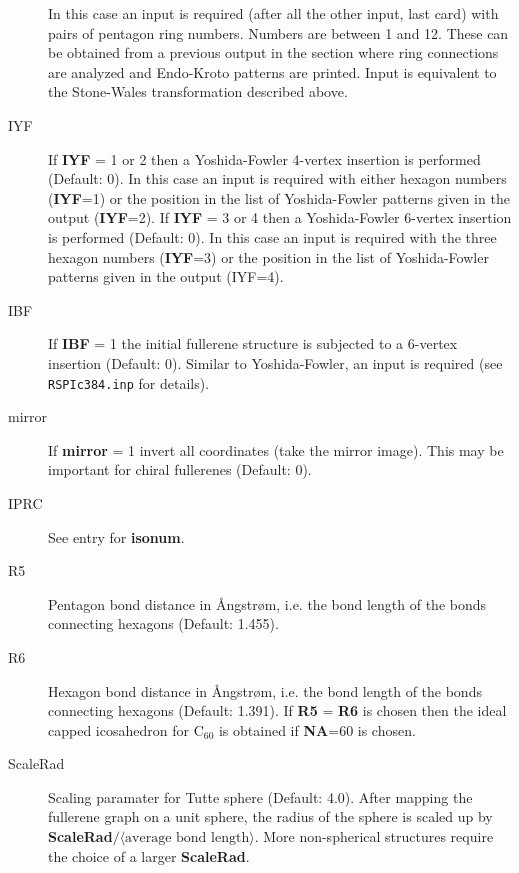 \documentclass[article,a4paper,twoside]{memoir}
\newcommand{\C}[1]{\ensuremath{\mathrm{C}_{#1}}}
\newcommand{\filename}[1]{\texttt{#1}}
\newcommand{\paramname}[1]{{\color{green}\textbf{#1}}}
\begin{document}
\begin{description}
In this case an input is required (after all the other input, last card) with pairs of
pentagon ring numbers. Numbers are between 1 and 12. These can be obtained
from a previous output in the section where ring connections are analyzed
and Endo-Kroto patterns are printed. Input is equivalent to the Stone-Wales transformation described above.
\item[IYF] 
If \paramname{IYF} = 1 or 2 then a Yoshida-Fowler 4-vertex insertion \cite{Yoshida97} is performed (Default: 0). 
In this case an input is required  with either hexagon numbers (\paramname{IYF}=1) or the position in
the list of Yoshida-Fowler patterns given in the output (\paramname{IYF}=2).
If \paramname{IYF} = 3 or 4 then a Yoshida-Fowler 6-vertex insertion \cite{Yoshida97} is performed (Default: 0). 
In this case an input is required with the three hexagon numbers (\paramname{IYF}=3) or the position in
the list of Yoshida-Fowler patterns given in the output (IYF=4).
\item[IBF] 
If \paramname{IBF} = 1 the initial fullerene structure is subjected to a 6-vertex insertion (Default: 0).
Similar to Yoshida-Fowler, an input is required (see \filename{RSPIc384.inp} for details).
\item[mirror] 
If \paramname{mirror} = 1 invert all coordinates (take the mirror image). This may be important for chiral fullerenes (Default: 0).
\item[IPRC] See entry for \paramname{isonum}.
\item[R5] Pentagon bond distance in \AA ngstr{\o}m, i.e. the bond length of the bonds connecting hexagons (Default: 1.455).
\item[R6] Hexagon  bond distance in \AA ngstr{\o}m, i.e. the bond length of the bonds connecting hexagons (Default: 1.391).
If \paramname{R5} = \paramname{R6} is chosen then the ideal capped icosahedron for \C{60} is obtained if \paramname{NA}=60 is chosen.
\item[ScaleRad] Scaling paramater for Tutte sphere (Default: 4.0).  After mapping the fullerene graph
on a unit sphere, the radius of the sphere is scaled up by \paramname{ScaleRad}$/\langle\text{average bond length}\rangle$.
More non-spherical structures require the choice of a larger \paramname{ScaleRad}.
\end{description}
\end{document}
